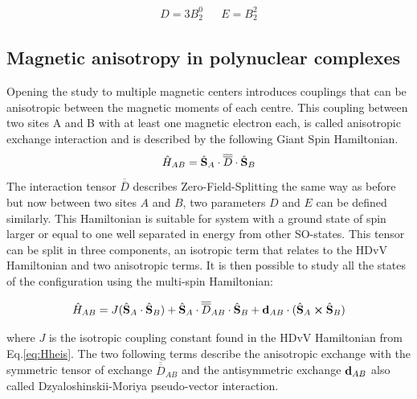 \documentclass[12pt,a4paper]{report}
\numberwithin{equation}{section}
\begin{document}
\begin{align}
    D=3B_2^0 && E=B_2^2
\end{align}


\subsection{Magnetic anisotropy in polynuclear complexes}
Opening the study to multiple magnetic centers introduces couplings that can be anisotropic between the magnetic moments of each centre. 
This coupling between two sites A and B with at least one magnetic electron each, is called anisotropic exchange interaction and is described by the following Giant Spin Hamiltonian\cite{maurice_zero-field_2011}.
\begin{equation}
    \hat{H}_{AB}=\hat{\vb S}_A\cdot \overline{\overline{D}} \cdot \hat{\vb S}_B
\end{equation}
The interaction tensor $\overline{\overline{D}}$ describes Zero-Field-Splitting the same way as before but now between two sites $A$ and $B$, two parameters $D$ and $E$ can be defined similarly. 
This Hamiltonian is suitable for system with a ground state of spin larger or equal to one well separated in energy from other SO-states.
This tensor can be split in three components, an isotropic term that relates to the HDvV Hamiltonian and two anisotropic terms.
It is then possible to study all the states of the configuration using the multi-spin Hamiltonian:\cite{noauthor_r_nodate}

\begin{equation}
    \hat{H}_{AB}=J(\hat{\vb S}_A \cdot \hat{\vb S}_B) + \hat{\vb S}_A \cdot\overline{\overline{D}}_{AB} \cdot \hat{\vb S}_B + \vb{d}_{AB} \cdot (\hat{\vb S}_A \cross \hat{\vb S}_B)
\end{equation}

\noindent where $J$ is the isotropic coupling constant found in the HDvV Hamiltonian from Eq.\ref{eq:Hheis}.
The two following terms describe the anisotropic exchange with the symmetric tensor of exchange $\overline{\overline{D}}_{AB}$ and the antisymmetric exchange $\vb{d}_{AB}$ also called Dzyaloshinskii-Moriya pseudo-vector interaction.
\end{document}
